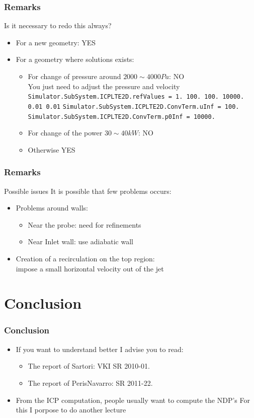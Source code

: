 \documentclass[compress,10pt]{beamer}
\begin{document}
\begin{frame}
 \frametitle{Remarks}
\begin{block}{Is it necessary to redo this always?}
\begin{itemize}
 \item For a new geometry: YES
 \item For a geometry where solutions exists:
  \begin{itemize}
    \item For change of pressure around $2000\sim4000Pa$: NO\\
    You just need to adjust the pressure and velocity\\
\texttt{Simulator.SubSystem.ICPLTE2D.refValues = 1. 100. 100. 10000. 0.01 0.01}
\texttt{Simulator.SubSystem.ICPLTE2D.ConvTerm.uInf = 100.}
\texttt{Simulator.SubSystem.ICPLTE2D.ConvTerm.p0Inf = 10000.}
     \item For change of the power $30\sim40 kW$: NO
     \item Otherwise YES
\end{itemize}
\end{itemize}

 
\end{block}

\end{frame}

\begin{frame}
 \frametitle{Remarks}
\begin{block}{Possible issues}
It is possible that few problems occurs:
\begin{itemize}
 \item Problems around walls:
\begin{itemize}
 \item Near the probe: need for refinements
 \item Near Inlet wall: use adiabatic wall
\end{itemize}
\item Creation of a recirculation on the top region:\\
impose a small horizontal velocity out of the jet
\end{itemize}
\end{block}
\end{frame}

\section{Conclusion}
\begin{frame}
 \frametitle{Conclusion}
\begin{itemize}
 \item If you want to understand better I advise you to read:
\begin{itemize}
\item The report of Sartori: VKI SR 2010-01.
\item The report of PerisNavarro: SR 2011-22.
\end{itemize}
\item From the ICP computation, people usually want to compute the NDP's
For this I porpose to do another lecture
\end{itemize}
\end{frame}
\end{document}
